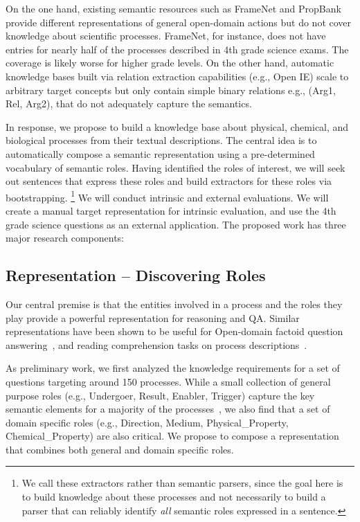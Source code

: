 
On the one hand, existing semantic resources such as FrameNet and PropBank provide different representations of 
general open-domain actions but do not cover knowledge about scientific processes. 
FrameNet, for instance, does not have entries for nearly half of the processes described in 4th grade science exams. 
The coverage is likely worse for higher grade levels. On the other hand, automatic knowledge bases built via relation extraction
capabilities (e.g., Open IE) scale to arbitrary target concepts but only contain simple binary relations e.g., (Arg1, Rel, Arg2), that do not adequately capture the semantics.

In response, we propose to build a knowledge base about physical, chemical, and biological processes from their textual descriptions. 
The central idea is to automatically compose a semantic representation using a pre-determined vocabulary of semantic roles. 
Having identified the roles of interest, we will seek out sentences that express these roles and build extractors for these roles via bootstrapping.
\footnote{
We call these extractors rather than semantic parsers, since the goal here is to build knowledge about these processes and 
not necessarily to build a parser that can reliably identify {\em all} semantic roles expressed in a sentence.} 
We will conduct intrinsic and external evaluations. 
We will create a manual target representation for intrinsic evaluation, and use the 4th grade science questions as an external application.
The proposed work has three major research components:

\subsection{Representation -- Discovering Roles}

Our central premise is that the entities involved in a process and the roles they play provide a powerful representation for reasoning and QA. 
Similar representations have been shown to be useful for Open-domain factoid question answering~\cite{shen2007using,pizzato2008indexing}, 
and reading comprehension tasks on process descriptions~\cite{berantSrikumar14}.

As preliminary work, we first analyzed the knowledge requirements for a set of questions targeting around 150 processes. 
While a small collection of general purpose roles (e.g., Undergoer, Result, Enabler, Trigger) capture the key semantic elements for a 
majority of the processes~\cite{louvan2015:kcap}, we also find that a set of domain specific roles (e.g., Direction, Medium, Physical\_Property, Chemical\_Property) are also critical. We propose to compose a representation that combines both general and domain specific roles. 

